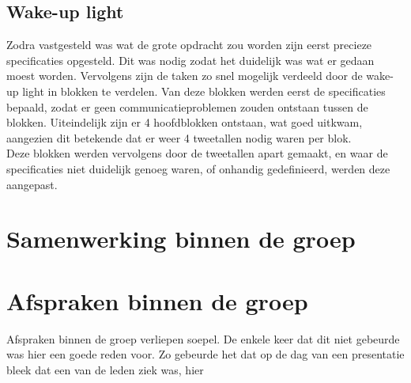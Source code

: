 \subsection{Wake-up light}
Zodra vastgesteld was wat de grote opdracht zou worden zijn eerst precieze specificaties opgesteld. 
Dit was nodig zodat het duidelijk was wat er gedaan moest worden.
Vervolgens zijn de taken zo snel mogelijk verdeeld door de wake-up light in blokken te verdelen. 
Van deze blokken werden eerst de specificaties bepaald, zodat er geen communicatieproblemen zouden ontstaan tussen de blokken.
Uiteindelijk zijn er 4 hoofdblokken ontstaan, wat goed uitkwam, aangezien dit betekende dat er weer 4 tweetallen nodig waren per blok. \\
Deze blokken werden vervolgens door de tweetallen apart gemaakt, en waar de specificaties niet duidelijk genoeg waren, of onhandig gedefinieerd, werden deze aangepast.

\section{Samenwerking binnen de groep}

\section{Afspraken binnen de groep}
Afspraken binnen de groep verliepen soepel. De enkele keer dat dit niet gebeurde was hier een goede reden voor. Zo gebeurde het dat op de dag van een presentatie bleek dat een van de leden ziek was, hier